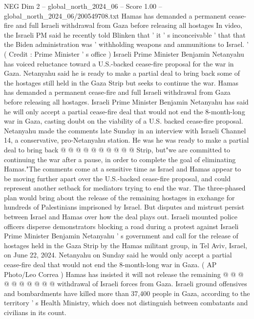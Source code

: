 \begin{textsample}{NEG Dim 2 – global\_north\_2024\_06 – Score 1.00 – global\_north\_2024\_06/200549708.txt}  \label{ex:f2_neg_129}
Hamas has demanded a permanent cease-fire and full Israeli withdrawal from Gaza before releasing all hostages In video, the Israeli PM said he recently told Blinken that ' it ' s inconceivable ' that that the Biden administration was ' withholding weapons and ammunitions to Israel. ' ( Credit : Prime Minister ' s office ) Israeli Prime Minister Benjamin Netanyahu has voiced reluctance toward a U.S.-backed cease-fire proposal for the war in Gaza.
Netanyahu said he is ready to make a partial deal to bring back some of the hostages still held in the Gaza Strip but seeks to continue the war.
Hamas has demanded a permanent cease-fire and full Israeli withdrawal from Gaza before releasing all hostages.
Israeli Prime Minister Benjamin Netanyahu has said he will only accept a partial cease-fire deal that would not end the 8-month-long war in Gaza, casting doubt on the viability of a U.S. backed cease-fire proposal.
Netanyahu made the comments late Sunday in an interview with Israeli Channel 14, a conservative, pro-Netanyahu station.
He was he was ready to make a partial deal to bring back @ @ @ @ @ @ @ @ @ @ Strip, but"we are committed to continuing the war after a pause, in order to complete the goal of eliminating Hamas."The comments come at a sensitive time as Israel and Hamas appear to be moving further apart over the U.S.-backed cease-fire proposal, and could represent another setback for mediators trying to end the war.
The three-phased plan would bring about the release of the remaining hostages in exchange for hundreds of Palestinians imprisoned by Israel.
But disputes and mistrust persist between Israel and Hamas over how the deal plays out.
Israeli mounted police officers disperse demonstrators blocking a road during a protest against Israeli Prime Minister Benjamin Netanyahu ' s government and call for the release of hostages held in the Gaza Strip by the Hamas militant group, in Tel Aviv, Israel, on June 22, 2024.
Netanyahu on Sunday said he would only accept a partial cease-fire deal that would not end the 8-month-long war in Gaza. ( AP Photo/Leo Correa ) Hamas has insisted it will not release the remaining @ @ @ @ @ @ @ @ @ @ withdrawal of Israeli forces from Gaza.
Israeli ground offensives and bombardments have killed more than 37,400 people in Gaza, according to the territory ' s Health Ministry, which does not distinguish between combatants and civilians in its count.

\end{textsample}

